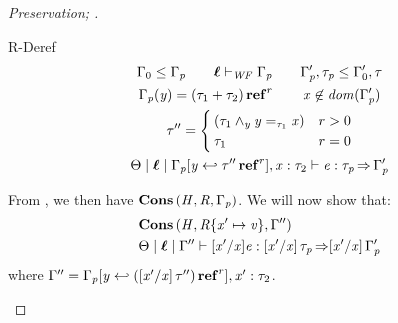 \begin{proof}[Preservation; ]
\begin{rneqncase}{R-Deref}
    \begin{gather*}
      \Gamma_{{\mathrm{0}}}  \leq  \Gamma_{\ottmv{p}} \quad\quad  \oldvec{\ell}   \vdash _{\wf}  \Gamma_{\ottmv{p}}  \quad\quad \Gamma'_{\ottmv{p}}  \ottsym{,}  \tau_{\ottmv{p}}  \leq  \Gamma'_{{\mathrm{0}}}  \ottsym{,}  \tau \\
      \Gamma_{\ottmv{p}}  \ottsym{(}  \mathit{y}  \ottsym{)}  \ottsym{=}   \ottsym{(}  \tau_{{\mathrm{1}}}  \ottsym{+}  \tau_{{\mathrm{2}}}  \ottsym{)}  \TREF^{ r }  \quad\quad  \mathit{x}  \not\in \DOM( \Gamma'_{\ottmv{p}} )  \\
      \tau'' = \begin{cases}
        \ottsym{(}   \tau_{{\mathrm{1}}}  \wedge_{ \mathit{y} }   \mathit{y}  =_{ \tau_{{\mathrm{1}}} }  \mathit{x}    \ottsym{)} &  r   \ottsym{>}   \ottsym{0}  \\
        \tau_{{\mathrm{1}}} & r  \ottsym{=}  \ottsym{0}
      \end{cases} \\
       \Theta   \mid   \oldvec{\ell}   \mid   \Gamma_{\ottmv{p}}  \ottsym{[}  \mathit{y}  \hookleftarrow   \tau''  \TREF^{ r }   \ottsym{]}  \ottsym{,}  \mathit{x}  \ottsym{:}  \tau_{{\mathrm{2}}}   \vdash   \ottnt{e}  :  \tau_{\ottmv{p}}   \produces   \Gamma'_{\ottmv{p}} 
    \end{gather*}
    
    From , we then have $\mathbf{Cons} \, (  \mathit{H}  ,  \mathit{R}  ,  \Gamma_{\mathit{p}}  )$.
    We will now show that:
    \begin{align}
      \label{eqn:new-tyenv-cons} & \ottkw{Cons} \, \ottsym{(}  \ottnt{H}  \ottsym{,}  \ottnt{R}  \ottsym{\{}  \mathit{x'}  \mapsto  \ottnt{v}  \ottsym{\}}  \ottsym{,}  \Gamma''  \ottsym{)} \\
                                 &  \Theta   \mid   \oldvec{\ell}   \mid   \Gamma''   \vdash     [  \mathit{x'}  /  \mathit{x}  ]    \ottnt{e}   :   [  \mathit{x'}  /  \mathit{x}  ]  \, \tau_{\ottmv{p}}   \produces    [  \mathit{x'}  /  \mathit{x}  ]  \, \Gamma'_{\ottmv{p}} 
    \end{align}
    where $\Gamma''  =  \Gamma_{\mathit{p}}  [  \mathit{y}  \hookleftarrow   (   [  \mathit{x'}  /  \mathit{x}  ]  \, \tau''  )  \operatorname{\mathbf{ref}}^{ r }   ]  ,  \mathit{x'}  :  \tau_{{\mathrm{2}}}$.


\end{rneqncase}
\end{proof}
